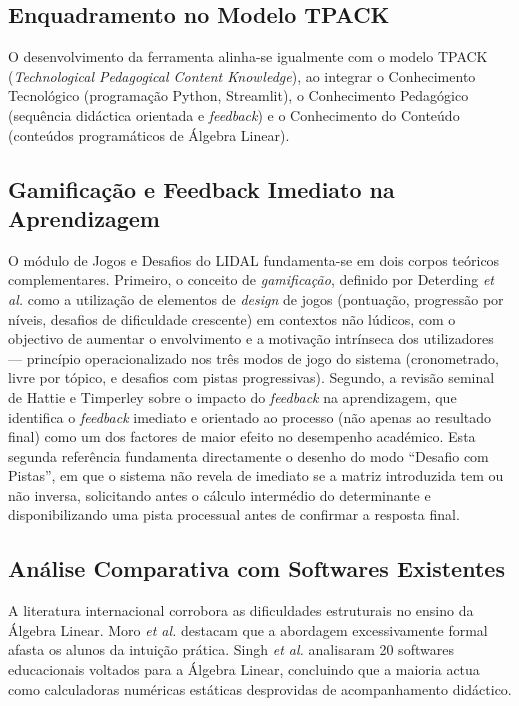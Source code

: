 \documentclass[conference]{IEEEtran}
\begin{document}
\subsection{Enquadramento no Modelo TPACK}

O desenvolvimento da ferramenta alinha-se igualmente com o modelo TPACK (\textit{Technological Pedagogical Content Knowledge}), ao integrar o Conhecimento Tecnológico (programação Python, Streamlit), o Conhecimento Pedagógico (sequência didáctica orientada e \textit{feedback}) e o Conhecimento do Conteúdo (conteúdos programáticos de Álgebra Linear).

\subsection{Gamificação e Feedback Imediato na Aprendizagem}

O módulo de Jogos e Desafios do LIDAL fundamenta-se em dois corpos teóricos complementares. Primeiro, o conceito de \textit{gamificação}, definido por Deterding \textit{et al.} \cite{deterding2011} como a utilização de elementos de \textit{design} de jogos (pontuação, progressão por níveis, desafios de dificuldade crescente) em contextos não lúdicos, com o objectivo de aumentar o envolvimento e a motivação intrínseca dos utilizadores --- princípio operacionalizado nos três modos de jogo do sistema (cronometrado, livre por tópico, e desafios com pistas progressivas). Segundo, a revisão seminal de Hattie e Timperley \cite{hattie2007} sobre o impacto do \textit{feedback} na aprendizagem, que identifica o \textit{feedback} imediato e orientado ao processo (não apenas ao resultado final) como um dos factores de maior efeito no desempenho académico. Esta segunda referência fundamenta directamente o desenho do modo ``Desafio com Pistas'', em que o sistema não revela de imediato se a matriz introduzida tem ou não inversa, solicitando antes o cálculo intermédio do determinante e disponibilizando uma pista processual antes de confirmar a resposta final.

\subsection{Análise Comparativa com Softwares Existentes}

A literatura internacional corrobora as dificuldades estruturais no ensino da Álgebra Linear. Moro \textit{et al.} \cite{moro2016} destacam que a abordagem excessivamente formal afasta os alunos da intuição prática. Singh \textit{et al.} \cite{singh2021} analisaram 20 softwares educacionais voltados para a Álgebra Linear, concluindo que a maioria actua como calculadoras numéricas estáticas desprovidas de acompanhamento didáctico.
\end{document}
